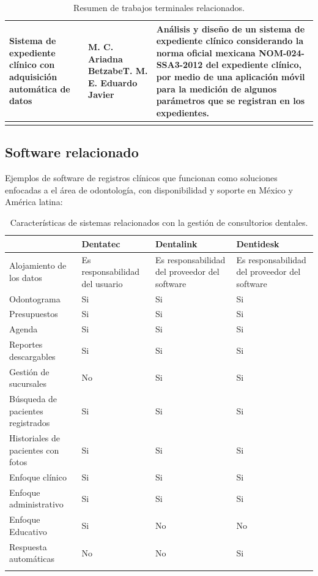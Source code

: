 \begin{longtable}{|p{4cm}|p{5cm}|p{7.5cm}|}
Sistema de expediente clínico con adquisición automática de datos
& M. C. Ariadna Betzabe\newline T. M. E. Eduardo Javier
& Análisis y diseño de un sistema de expediente clínico considerando la norma oficial mexicana NOM-024-SSA3-2012 del expediente clínico, por medio de una aplicación móvil para la medición de algunos parámetros que se registran en los expedientes.\\\hline
\caption{Resumen de trabajos terminales relacionados.}
\label{table:1}
\end{longtable}

\newpage
\subsection{Software relacionado}

Ejemplos de software de registros clínicos que funcionan como soluciones enfocadas a el área de odontología, con disponibilidad y soporte en México y América latina:

\setlength\LTleft{0cm}
\begin{longtable}[H]{|p{}|C{0.20\textwidth}|C{0.20\textwidth}|C{0.20\textwidth}|}
\hline & Dentatec         & Dentalink         & Dentidesk         \\ 
\hline
Alojamiento de los datos           & Es responsabilidad del usuario & Es responsabilidad del proveedor del software & Es responsabilidad del proveedor del software 
\\ \hline 
Odontograma          & Si & Si  & Si  
\\ \hline
Presupuestos         & Si & Si  & Si  
\\ \hline
Agenda & Si & Si  & Si  
\\ \hline
Reportes descargables& Si & Si  & Si  
\\ \hline
Gestión de sucursales             & No & Si  & Si  
\\ \hline
Búsqueda de pacientes registrados & Si & Si  & Si  
\\ \hline
Historiales de pacientes con fotos & Si & Si  & Si  
\\ \hline
Enfoque clínico     & Si & Si  & Si  
\\ \hline
Enfoque administrativo             & Si & Si  & Si  
\\ \hline
Enfoque Educativo    & Si & No  & No  
\\ \hline
Respuesta automáticas             & No & No  & Si  
\\ \hline
\caption{Características de sistemas relacionados con la gestión de consultorios dentales.} \label{table:1} 
\end{longtable}


